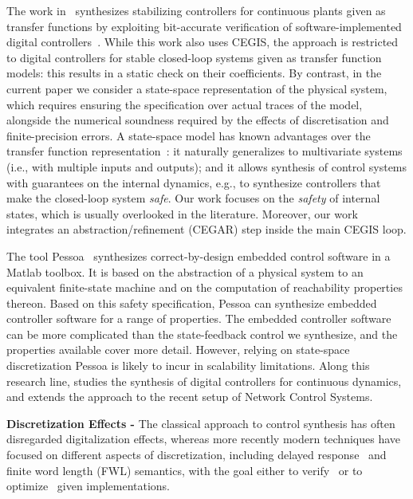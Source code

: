 \documentclass[twocolumn]{autart}    %
\begin{document}
The work in~\cite{hscc-paper} synthesizes stabilizing controllers for
continuous plants given as transfer functions by exploiting bit-accurate
verification of software-implemented digital controllers~\cite{Bessa16}. 
While this work also uses CEGIS, the approach is restricted to digital
controllers for stable closed-loop systems given as transfer function
models: this results in a static check on their coefficients.  By contrast,
in the current paper we consider a state-space representation of the
physical system, which requires ensuring the specification over actual
traces of the model, alongside the numerical soundness required by the
effects of discretisation and finite-precision errors.  A state-space model
has known advantages over the transfer function
representation~\cite{Franklin15}: it naturally generalizes to multivariate
systems (i.e., with multiple inputs and outputs); and it allows synthesis of
control systems with guarantees on the internal dynamics, e.g., to
synthesize controllers that make the closed-loop system \emph{safe}.  Our
work focuses on the \emph{safety} of internal states, which is usually
overlooked in the literature.  Moreover, our work integrates an
abstraction/refinement (CEGAR) step inside the main CEGIS loop.

The tool Pessoa~\cite{mazo2010pessoa} synthesizes correct-by-design embedded
control software in a Matlab toolbox.  It is based on the abstraction of a
physical system to an equivalent finite-state machine and on the computation
of reachability properties thereon.  Based on this safety specification,
\mbox{Pessoa} can synthesize embedded controller software for a range of
properties.  The embedded controller software can be more complicated than
the state-feedback control we synthesize, and the properties available cover
more detail.  However, relying on state-space discretization \mbox{Pessoa}
is likely to incur in scalability limitations.  Along this research line,
\cite{Anta2010,liu16} studies the synthesis of digital controllers for
continuous dynamics, and \cite{zamani2014} extends the approach to the
recent setup of Network Control Systems.

\textbf{Discretization Effects -}
The classical approach to control synthesis has often disregarded
digitalization effects, whereas more recently modern techniques have focused
on different aspects of discretization, including delayed
response~\cite{Duggirala2015} and finite word length (FWL) semantics, with
the goal either to verify~\cite{daes20161} or to optimize~\cite{oudjida2014design} given implementations.
\end{document}
